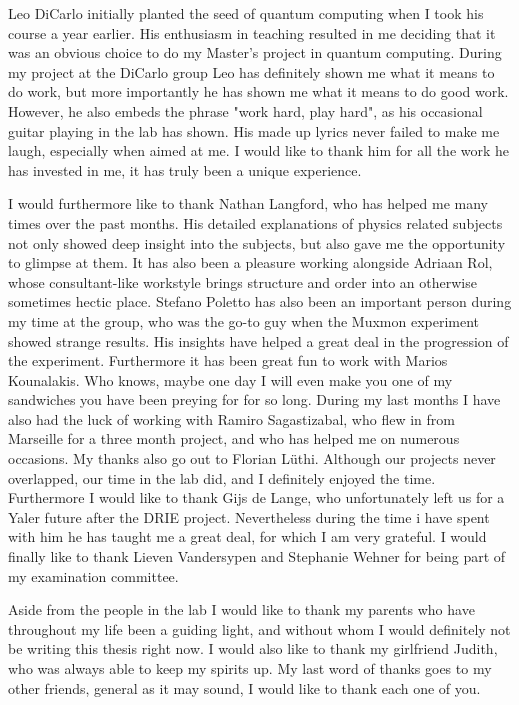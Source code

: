 \documentclass[12pt]{report}
\begin{document}
Leo DiCarlo initially planted the seed of quantum computing when I took his course a year earlier. His enthusiasm in teaching resulted in me deciding that it was an obvious choice to do my Master's project in quantum computing. During my project at the DiCarlo group Leo has definitely shown me what it means to do work, but more importantly he has shown me what it means to do good work. However, he also embeds the phrase "work hard, play hard", as his occasional guitar playing in the lab has shown. His made up lyrics never failed to make me laugh, especially when aimed at me. I would like to thank him for all the work he has invested in me, it has truly been a unique experience.

I would furthermore like to thank Nathan Langford, who has helped me many times over the past months. His detailed explanations of physics related subjects not only showed deep insight into the subjects, but also gave me the opportunity to glimpse at them. It has also been a pleasure working alongside Adriaan Rol, whose consultant-like workstyle brings structure and order into an otherwise sometimes hectic place. Stefano Poletto has also been an important person during my time at the group, who was the go-to guy when the Muxmon experiment showed strange results. His insights have helped a great deal in the progression of the experiment. Furthermore it has been great fun to work with Marios Kounalakis. Who knows, maybe one day I will even make you one of my sandwiches you have been preying for for so long. During my last months I have also had the luck of working with Ramiro Sagastizabal, who flew in from Marseille for a three month project, and who has helped me on numerous occasions. My thanks also go out to Florian L\"uthi. Although our projects never overlapped, our time in the lab did, and I definitely enjoyed the time. Furthermore I would like to thank Gijs de Lange, who unfortunately left us for a Yaler future after the DRIE project. Nevertheless during the time i have spent with him he has taught me a great deal, for which I am very grateful. I would finally like to thank Lieven Vandersypen and Stephanie Wehner for being part of my examination committee.

Aside from the people in the lab I would like to thank my parents who have throughout my life been a guiding light, and without whom I would definitely not be writing this thesis right now. I would also like to thank my girlfriend Judith, who was always able to keep my spirits up. My last word of thanks goes to my other friends, general as it may sound, I would like to thank each one of you.
\end{document}
